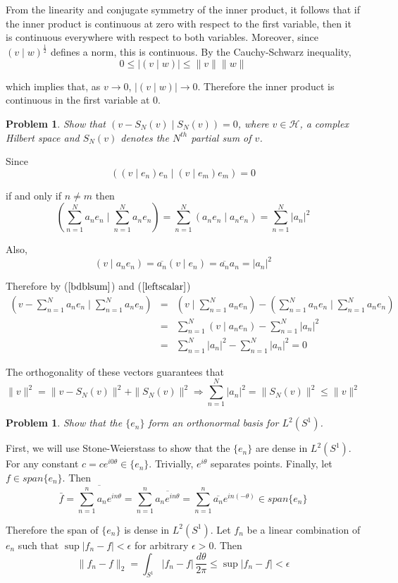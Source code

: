 \documentclass[letterpaper,11pt]{article}
\newtheorem{problem}[theorem]{Problem}
\newcommand{\ip}[2]{\left(#1\mid#2\right)}
\begin{document}
From the linearity and conjugate symmetry of the inner product, it follows that if the inner product is continuous at zero with respect to the first variable, then it is continuous everywhere with respect to both variables.  Moreover, since $\ip{v}{w}^{\frac{1}{2}}$ defines a norm, this is continuous.  By the Cauchy-Schwarz inequality,
\[
0 \leq |\ip{v}{w}| \leq \|v\|\|w\|
\]

which implies that, as $v \rightarrow 0$, $|\ip{v}{w}| \rightarrow 0$.  Therefore the inner product is continuous in the first variable at $0$.

\begin{problem}
Show that $\ip{v - S_N(v)}{S_N(v)} = 0$, where $v \in \mathcal{H}$, a complex Hilbert space and $S_N(v)$ denotes the $N^{th}$ partial sum of $v$.
\end{problem}

Since
\[
\ip{\ip{v}{e_n} e_n}{\ip{v}{e_m} e_m} = 0
\]

if and only if $n \neq m$ then
\begin{equation}
\label{bdblsum}
\ip{\sum_{n=1}^N a_n e_n}{\sum_{n=1}^N a_n e_n} = \sum_{n=1}^N \ip{a_n e_n}{a_n e_n} = \sum_{n=1}^N |a_n|^2
\end{equation}

Also,
\begin{equation}
\label{leftscalar}
\ip{v}{a_n e_n} = \overline{a_n} \ip{v}{e_n} = \overline{a_n} a_n = |a_n|^2
\end{equation}

Therefore by ($\ref{bdblsum}$) and ($\ref{leftscalar}$) 
\begin{eqnarray*}
\ip{v - \sum_{n=1}^N a_n e_n}{\sum_{n=1}^N a_n e_n} &=& \ip{v}{\sum_{n=1}^N a_n e_n} - \ip{\sum_{n=1}^N a_n e_n}{\sum_{n=1}^N a_n e_n} \\
&=& \sum_{n=1}^N \ip{v}{a_n e_n} - \sum_{n=1}^N |a_n|^2 \\
&=& \sum_{n=1}^N |a_n|^2 - \sum_{n=1}^N |a_n|^2 = 0
\end{eqnarray*}

The orthogonality of these vectors guarantees that
\[
\|v\|^2 = \|v - S_N(v)\|^2 + \|S_N(v)\|^2 \Rightarrow \sum_{n=1}^N |a_n|^2 = \|S_N(v)\|^2  \leq \|v\|^2
\]

\begin{problem}
Show that the $\{e_n\}$ form an orthonormal basis for $L^2(S^1)$.
\end{problem}

First, we will use Stone-Weierstass to show that the $\{e_n\}$ are dense in $L^2(S^1)$.  For any constant $c = ce^{i0\theta} \in \{e_n\}$.  Trivially, $e^{i\theta}$ separates points.  Finally, let $f \in span\{e_n\}$.  Then
\[
\bar{f} = \overline{\sum_{n=1}^n a_n e^{in\theta}} = \sum_{n=1}^n \overline{a_n e^{in\theta}} = \sum_{n=1}^n \overline{a_n} e^{in(-\theta)} \in span\{e_n\}
\]

Therefore the span of $\{e_n\}$ is dense in $L^2(S^1)$.  Let $f_n$ be a linear combination of $e_n$ such that $\sup|f_n - f| < \epsilon$ for arbitrary $\epsilon > 0$.  Then
\[
\|f_n - f\|_2 = \int_{S^1} |f_n - f| \,\frac{d\theta}{2\pi} \leq \sup |f_n - f| < \epsilon
\]
\end{document}
